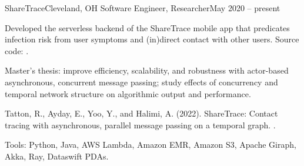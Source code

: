 \begin{ritemize}
{ShareTrace}{Cleveland, OH}
{Software Engineer, Researcher}{May 2020 -- present}
	\item Developed the serverless backend of the ShareTrace mobile app that predicates infection risk from user symptoms and (in)direct contact with other users. Source code: .
	\item Master's thesis: improve efficiency, scalability, and robustness with actor-based asynchronous, concurrent message passing; study effects of concurrency and temporal network structure on algorithmic output and performance.
	\item Tatton, R., Ayday, E., Yoo, Y., and Halimi, A. (2022). ShareTrace: Contact tracing with asynchronous, parallel message passing on a temporal graph.
	 .
	\item Tools: Python, Java, AWS Lambda, Amazon EMR, Amazon S3, Apache Giraph, Akka, Ray, Dataswift PDAs.
\end{ritemize}